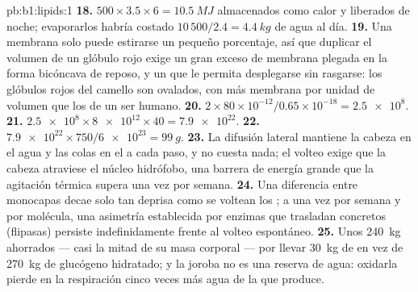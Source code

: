\begin{solution}{pb:b1:lipids:1}
\textbf{18.} $500\times 3.5\times 6 = \qty{10.5}{MJ}$ almacenados como calor y liberados de noche; evaporarlos habría costado $10\,500/2.4 = \qty{4.4}{kg}$ de agua al día.
\textbf{19.} Una membrana solo puede estirarse un pequeño porcentaje, así
que duplicar el volumen de un glóbulo rojo exige un gran exceso de membrana
plegada en la forma bicóncava de reposo, y un  que le permita
desplegarse sin rasgarse: los glóbulos rojos del camello son ovalados, con
más membrana por unidad de volumen que los de un ser humano.
\textbf{20.} $2\times 80\times 10^{-12}/0.65\times 10^{-18} = \num{2.5e8}$.
\textbf{21.} $\num{2.5e8}\times\num{8e12}\times 40 = \num{7.9e22}$.
\textbf{22.} $\num{7.9e22}\times 750/\num{6e23} = \qty{99}{g}$.
\textbf{23.} La difusión lateral mantiene la cabeza en el agua y las colas
en el  a cada paso, y no cuesta nada; el volteo exige que la cabeza
 atraviese el núcleo hidrófobo, una barrera de energía grande que la
agitación térmica supera una vez por semana.
\textbf{24.} Una diferencia entre monocapas decae solo tan deprisa como se
voltean los ; a una vez por semana y por molécula, una asimetría
establecida por enzimas que trasladan  concretos (flipasas) persiste
indefinidamente frente al volteo espontáneo.
\textbf{25.} Unos \qty{240}{kg} ahorrados --- casi la mitad de su masa
corporal --- por llevar \qty{30}{kg} de  en vez de \qty{270}{kg} de
glucógeno hidratado; y la joroba no es una reserva de agua: oxidarla pierde
en la respiración cinco veces más agua de la que produce.
\end{solution}
